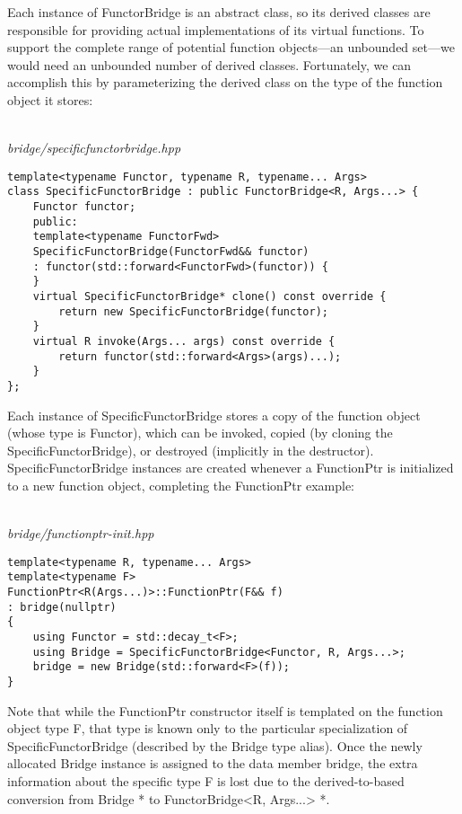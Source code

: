 Each instance of FunctorBridge is an abstract class, so its derived classes are responsible for providing actual implementations of its virtual functions. To support the complete range of potential function objects—an unbounded set—we would need an unbounded number of derived classes. Fortunately, we can accomplish this by parameterizing the derived class on the type of the function object it stores:

\hspace*{\fill} \\ %
\noindent
\textit{bridge/specificfunctorbridge.hpp}
\begin{lstlisting}[style=styleCXX]
template<typename Functor, typename R, typename... Args>
class SpecificFunctorBridge : public FunctorBridge<R, Args...> {
	Functor functor;
	public:
	template<typename FunctorFwd>
	SpecificFunctorBridge(FunctorFwd&& functor)
	: functor(std::forward<FunctorFwd>(functor)) {
	}
	virtual SpecificFunctorBridge* clone() const override {
		return new SpecificFunctorBridge(functor);
	}
	virtual R invoke(Args... args) const override {
		return functor(std::forward<Args>(args)...);
	}
};
\end{lstlisting}

Each instance of SpecificFunctorBridge stores a copy of the function object (whose type is Functor), which can be invoked, copied (by cloning the SpecificFunctorBridge), or destroyed (implicitly in the destructor). SpecificFunctorBridge instances are created whenever a FunctionPtr is initialized to a new function object, completing the FunctionPtr example:

\hspace*{\fill} \\ %
\noindent
\textit{bridge/functionptr-init.hpp}
\begin{lstlisting}[style=styleCXX]
template<typename R, typename... Args>
template<typename F>
FunctionPtr<R(Args...)>::FunctionPtr(F&& f)
: bridge(nullptr)
{
	using Functor = std::decay_t<F>;
	using Bridge = SpecificFunctorBridge<Functor, R, Args...>;
	bridge = new Bridge(std::forward<F>(f));
}
\end{lstlisting}

Note that while the FunctionPtr constructor itself is templated on the function object type F, that type is known only to the particular specialization of SpecificFunctorBridge (described by the Bridge type alias). Once the newly allocated Bridge instance is assigned to the data member bridge, the extra information about the specific type F is lost due to the derived-to-based conversion from Bridge * to FunctorBridge<R, Args...> *.

